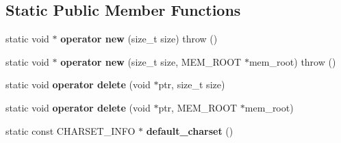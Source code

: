 \subsection*{Static Public Member Functions}
\begin{DoxyCompactItemize}
\item 
\mbox{\label{classItem_aee11dfd52d4450357bfba809e1cb8f39}} 
static void $\ast$ {\bfseries operator new} (size\+\_\+t size)  throw ()
\item 
\mbox{\label{classItem_a77473a8e4e8b1ebb64b67b5bed10b348}} 
static void $\ast$ {\bfseries operator new} (size\+\_\+t size, M\+E\+M\+\_\+\+R\+O\+OT $\ast$mem\+\_\+root)  throw ()
\item 
\mbox{\label{classItem_a3f97522131ddb578fe2f42695d7a5eb1}} 
static void {\bfseries operator delete} (void $\ast$ptr, size\+\_\+t size)
\item 
\mbox{\label{classItem_a2b0da98bc2d073daca299da270cd364c}} 
static void {\bfseries operator delete} (void $\ast$ptr, M\+E\+M\+\_\+\+R\+O\+OT $\ast$mem\+\_\+root)
\item 
\mbox{\label{classItem_a1f84346cd539f1d821032f82889c4e0a}} 
static const C\+H\+A\+R\+S\+E\+T\+\_\+\+I\+N\+FO $\ast$ {\bfseries default\+\_\+charset} ()
\end{DoxyCompactItemize}
